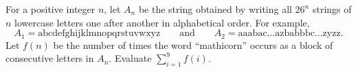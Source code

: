 For a positive integer $n$, let $A_n$ be the string obtained by writing all $26^n$ strings of $n$ lowercase letters one after another in alphabetical order. For example,
\[A_1=\text{abcdefghijklmnopqrstuvwxyz}\qquad\text{and}\qquad A_2=\text{aaabac}\dots\text{azbabbbc}\dots\text{zyzz}.\]
Let $f(n)$ be the number of times the word ``mathicorn'' occurs as a block of consecutive letters in $A_n$. Evaluate $\displaystyle\sum_{i=1}^{9}f(i)$.
